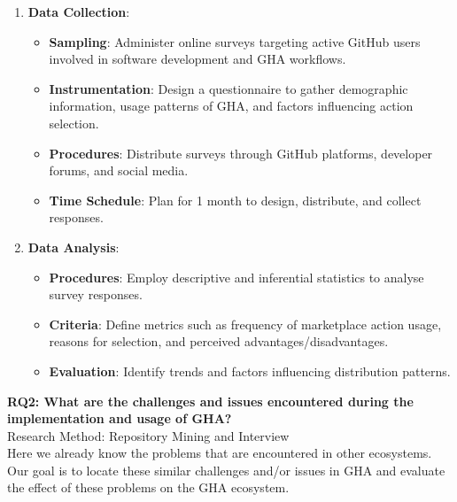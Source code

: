 \documentclass[conference]{IEEEtran}
\begin{document}
        \begin{enumerate}
            \item \textbf{Data Collection}:\\
            \begin{itemize}
                \item \textbf{Sampling}: Administer online surveys targeting active GitHub users involved in software development and GHA workflows.
                \item \textbf{Instrumentation}: Design a questionnaire to gather demographic information, usage patterns of GHA, and factors influencing action selection.
                \item \textbf{Procedures}: Distribute surveys through GitHub platforms, developer forums, and social media.
                \item \textbf{Time Schedule}: Plan for 1 month to design, distribute, and collect responses.\\
            \end{itemize}
            
            \item \textbf{Data Analysis}:\\
            \begin{itemize}
                \item \textbf{Procedures}: Employ descriptive and inferential statistics to analyse survey responses.
                \item \textbf{Criteria}: Define metrics such as frequency of marketplace action usage, reasons for selection, and perceived advantages/disadvantages.
                \item \textbf{Evaluation}: Identify trends and factors influencing distribution patterns.\\
            \end{itemize}
        \end{enumerate}

        \textbf{RQ2: What are the challenges and issues encountered during the implementation and usage of GHA?}\\

        Research Method: Repository Mining and Interview\\

        Here we already know the problems that are encountered in other ecosystems. Our goal is to locate these similar challenges and/or issues in GHA and evaluate the effect of these problems on the GHA ecosystem.\\
\end{document}
